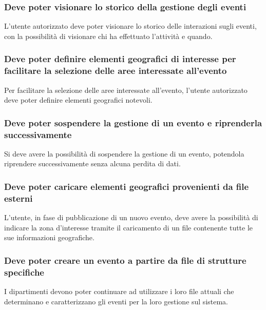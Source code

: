 \documentclass{article}
\begin{document}
\subsubsection{Deve poter visionare lo storico della gestione degli eventi}
\label{5.3.5}
L'utente autorizzato deve poter visionare lo storico delle interazioni sugli eventi, con la possibilità di visionare chi ha effettuato l'attività e quando.

\subsubsection{Deve poter definire elementi geografici di interesse per facilitare la selezione delle aree interessate all'evento}
\label{5.3.6}
Per facilitare la selezione delle aree interessate all'evento, l'utente autorizzato deve poter definire elementi geografici notevoli.

\subsubsection{Deve poter sospendere la gestione di un evento e riprenderla successivamente}
\label{5.3.7}
Si deve avere la possibilità di sospendere la gestione di un evento, potendola riprendere successivamente senza alcuna perdita di dati.

\subsubsection{Deve poter caricare elementi geografici provenienti da file esterni}
\label{5.3.8}
L'utente, in fase di pubblicazione di un nuovo evento, deve avere la possibilità di indicare la zona d'interesse tramite il caricamento di un file contenente tutte le sue informazioni geografiche.

\subsubsection{Deve poter creare un evento a partire da file di strutture specifiche}
\label{5.3.9}
I dipartimenti devono poter continuare ad utilizzare i loro file attuali che determinano e caratterizzano gli eventi per la loro gestione sul sistema.
\end{document}

